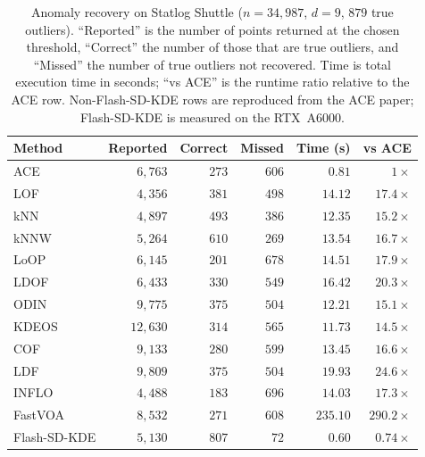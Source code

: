 \begin{table}[t]
  \centering
  \small
  \setlength{\tabcolsep}{4pt}
  \begin{tabular}{lrrrrr}
    \toprule
    Method        & Reported & Correct & Missed & Time (s) & vs ACE \\
    \midrule
    ACE           & $6{,}763$  & $273$ & $606$ & $0.81$    & $1\times$    \\
    LOF           & $4{,}356$  & $381$ & $498$ & $14.12$   & $17.4\times$ \\
    kNN           & $4{,}897$  & $493$ & $386$ & $12.35$   & $15.2\times$ \\
    kNNW          & $5{,}264$  & $610$ & $269$ & $13.54$   & $16.7\times$ \\
    LoOP          & $6{,}145$  & $201$ & $678$ & $14.51$   & $17.9\times$ \\
    LDOF          & $6{,}433$  & $330$ & $549$ & $16.42$   & $20.3\times$ \\
    ODIN          & $9{,}775$  & $375$ & $504$ & $12.21$   & $15.1\times$ \\
    KDEOS         & $12{,}630$ & $314$ & $565$ & $11.73$   & $14.5\times$ \\
    COF           & $9{,}133$  & $280$ & $599$ & $13.45$   & $16.6\times$ \\
    LDF           & $9{,}809$  & $375$ & $504$ & $19.93$   & $24.6\times$ \\
    INFLO         & $4{,}488$  & $183$ & $696$ & $14.03$   & $17.3\times$ \\
    FastVOA       & $8{,}532$  & $271$ & $608$ & $235.10$  & $290.2\times$ \\
    Flash-SD-KDE  & $5{,}130$  & $807$ & $72$  & $0.60$    & $0.74\times$ \\
    \bottomrule
  \end{tabular}
  \caption{Anomaly recovery on Statlog Shuttle ($n=34{,}987$, $d=9$,
           $879$ true outliers).
           ``Reported'' is the number of points returned at the chosen
           threshold, ``Correct'' the number of those that are true outliers,
           and ``Missed'' the number of true outliers not recovered.
           Time is total execution time in seconds; ``vs ACE'' is the
           runtime ratio relative to the ACE row.
           Non-Flash-SD-KDE rows are reproduced from the ACE paper;
           Flash-SD-KDE is measured on the RTX~A6000.}
  \label{tab:rebuttal_ace_shuttle}
\end{table}

